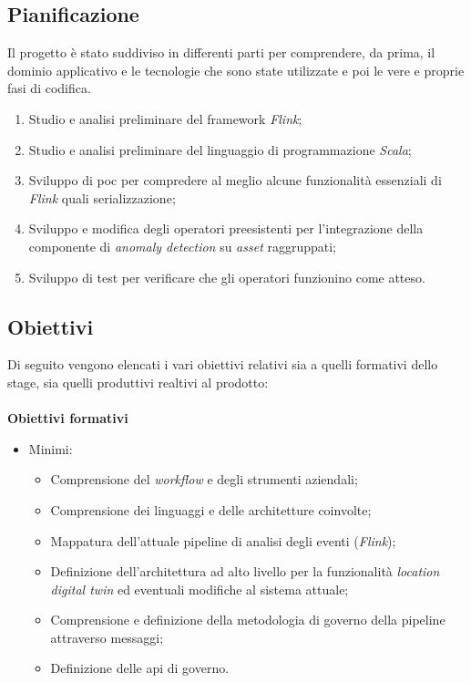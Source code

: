 \subsection{Pianificazione}
Il progetto è stato suddiviso in differenti parti per comprendere, da prima, il dominio applicativo e le tecnologie che sono state utilizzate e poi le vere e proprie fasi di codifica.

\begin{enumerate}
	\item{Studio e analisi preliminare del \gls{framework} \textit{Flink};}
	\item{Studio e analisi preliminare del linguaggio di programmazione \textit{Scala};}
	\item{Sviluppo di \gls{poc} per compredere al meglio alcune funzionalità essenziali di \textit{Flink} quali \gls{serializzazione};}
	\item{Sviluppo e modifica degli operatori preesistenti per l'integrazione della componente di \textit{anomaly detection} su \textit{asset} raggruppati;}
	\item{Sviluppo di test per verificare che gli operatori funzionino come atteso.}
\end{enumerate}

\subsection{Obiettivi}
Di seguito vengono elencati i vari obiettivi relativi sia a quelli formativi dello stage, sia quelli produttivi realtivi al prodotto:
\\ \\
\textbf{Obiettivi formativi}
\begin{itemize}
	\item{Minimi:
		\begin{itemize}
			\item{Comprensione del \textit{workflow} e degli strumenti aziendali;}
			\item{Comprensione dei linguaggi e delle architetture coinvolte;}
			\item{Mappatura dell’attuale \gls{pipeline} di analisi degli eventi (\textit{Flink});}
			\item{Definizione dell’architettura ad alto livello per la funzionalità \textit{location digital twin} ed eventuali modifiche al sistema attuale;}
			\item{Comprensione e definizione della metodologia di governo della \gls{pipeline} attraverso messaggi;}
			\item{Definizione delle \gls{api} di governo.}
		\end{itemize}			
	}
\end{itemize}

